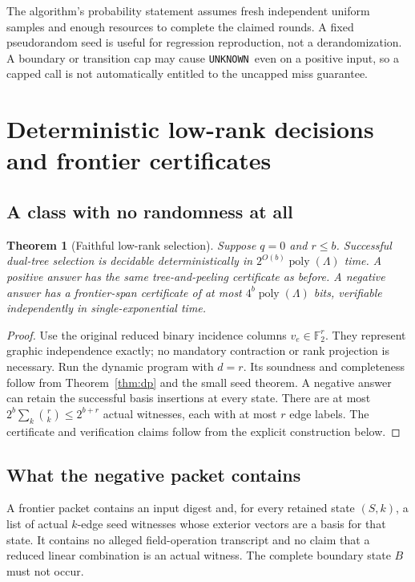 \documentclass[11pt,letterpaper]{article}
\newtheorem{theorem}{Theorem}[section]
\theoremstyle{definition}
\newcommand{\F}{\mathbb F}
\newcommand{\poly}{\operatorname{poly}}
\newcommand{\Unk}{\texttt{UNKNOWN}}
\begin{document}
The algorithm's probability statement assumes fresh independent uniform
samples and enough resources to complete the claimed rounds. A fixed
pseudorandom seed is useful for regression reproduction, not a derandomization.
A boundary or transition cap may cause \Unk\ even on a positive input, so a
capped call is not automatically entitled to the uncapped miss guarantee.

\section{Deterministic low-rank decisions and frontier certificates}\label{sec:frontier}
\subsection{A class with no randomness at all}
\begin{theorem}[Faithful low-rank selection]\label{thm:faithful}
Suppose $q=0$ and $r\leq b$. Successful dual-tree selection is decidable
deterministically in $2^{O(b)}\poly(\Lambda)$ time. A positive answer has
the same tree-and-peeling certificate as before. A negative answer has a
frontier-span certificate of at most $4^b\poly(\Lambda)$ bits, verifiable
independently in single-exponential time.
\end{theorem}
\begin{proof}
Use the original reduced binary incidence columns $v_e\in\F_2^r$.
They represent graphic independence exactly; no mandatory contraction or
rank projection is necessary. Run the dynamic program with $d=r$. Its
soundness and completeness follow from Theorem~\ref{thm:dp} and the small
seed theorem. A negative answer can retain the successful basis insertions
at every state. There are at most $2^b\sum_k\binom rk\leq2^{b+r}$
actual witnesses, each with at most $r$ edge labels. The certificate and
verification claims follow from the explicit construction below.
\end{proof}

\subsection{What the negative packet contains}
A frontier packet contains an input digest and, for every retained state
$(S,k)$, a list of actual $k$-edge seed witnesses whose exterior vectors are
a basis for that state. It contains no alleged field-operation transcript
and no claim that a reduced linear combination is an actual witness.
The complete boundary state $B$ must not occur.
\end{document}
